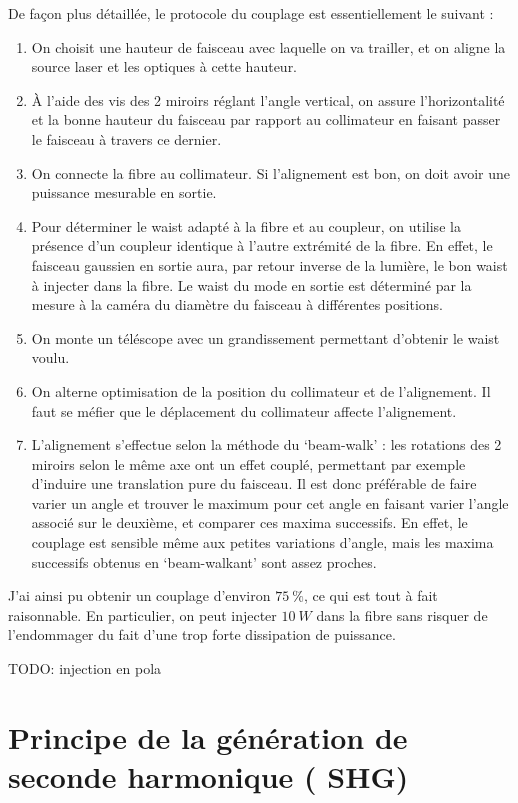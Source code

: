 \documentclass[11pt,a4paper] { article}
\begin{document}
De façon plus détaillée, le protocole du couplage est essentiellement le suivant :
\begin{enumerate}
	\item On choisit une hauteur de faisceau avec laquelle on va trailler, et on aligne la source laser et les optiques à cette hauteur.
	\item À l'aide des vis des 2 miroirs réglant l'angle vertical, on assure l'horizontalité et la bonne hauteur du faisceau par rapport au collimateur en faisant passer le faisceau à travers ce dernier.
	\item On connecte la fibre au collimateur. Si l'alignement est bon, on doit avoir une puissance mesurable en sortie.
	\item Pour déterminer le waist adapté à la fibre et au coupleur, on utilise la présence d'un coupleur identique à l'autre extrémité de la fibre. En effet, le faisceau gaussien en sortie aura, par retour inverse de la lumière, le bon waist à injecter dans la fibre. Le waist du mode en sortie est déterminé par la mesure à la caméra du diamètre du faisceau à différentes positions.	
	\item On monte un téléscope avec un grandissement permettant d'obtenir le waist voulu.
	\item On alterne optimisation de la position du collimateur et de l'alignement. Il faut se méfier que le déplacement du collimateur affecte l'alignement.
	\item L'alignement s'effectue selon la méthode du `beam-walk' : les rotations des 2 miroirs selon le même axe ont un effet couplé, permettant par exemple d'induire une translation pure du faisceau. Il est donc préférable de faire varier un angle et trouver le maximum pour cet angle en faisant varier l'angle associé sur le deuxième, et comparer ces maxima successifs. En effet, le couplage est sensible même aux petites variations d'angle, mais les maxima successifs obtenus en `beam-walkant' sont assez proches. 
\end{enumerate}

J'ai ainsi pu obtenir un couplage d'environ $\SI{75}{\percent}$, ce qui est tout à fait raisonnable. En particulier, on peut injecter $\SI{10}{W}$ dans la fibre sans risquer de l'endommager du fait d'une trop forte dissipation de puissance.

TODO: injection en pola


\section{Principe de la génération de seconde harmonique ( SHG)} %
\label{SHG}
\end{document}
